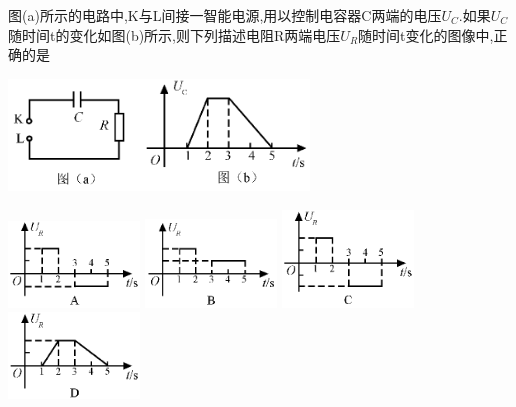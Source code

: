 \newpage
\question[6]图(a)所示的电路中,K与L间接一智能电源,用以控制电容器C两端的电压$U_C.$如果$U_C$随时间t的变化如图(b)所示,则下列描述电阻R两端电压$U_R$随时间t变化的图像中,正确的是
\begin{center}
\includegraphics[width=8cm]{img/image2.png}
\end{center}
\includegraphics[width=3.5cm]{img/image3.png}
\includegraphics[width=3.5cm]{img/image4.png}
\includegraphics[width=3.5cm]{img/image5.png}
\includegraphics[width=3.5cm]{img/image6.png}

\begin{solution}{4cm}

\end{solution}



